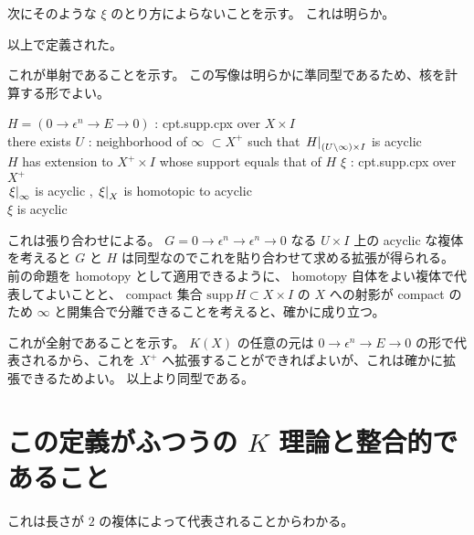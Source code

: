 \documentclass[dvipdfmx]{jsarticle}
\begin{document}
\begin{Proof}
\itemprof
次にそのような \(\xi\) のとり方によらないことを示す。
これは明らか。
\end{Proof}
以上で定義された。

これが単射であることを示す。
この写像は明らかに準同型であるため、核を計算する形でよい。

\begin{Theorem}
\itemprop
  \For \(H = (0 \to \epsilon^n \to E \to 0)\) : cpt.supp.cpx over \(X \times I\) \\
  \IfHold there exists \(U\) : neighborhood of \(\infty\) \(\subset X^+\) such that \(\left. {H} \right| _{(U \backslash \infty) \times I}\) is acyclic \\
  \Then \(H\) has extension to \(X^+ \times I\) whose support equals that of \(H\)
\itemprop
  \For \(\xi\) : cpt.supp.cpx over \(X^+\) \\
  \IfHold \(\left. {\xi} \right| _{\infty}\) is acyclic , \(\left. {\xi} \right| _{X}\) is homotopic to acyclic \\
  \Then \(\xi\) is acyclic
\end{Theorem}

\begin{Proof}
\itemprof
  これは張り合わせによる。
  \(G = 0 \to \epsilon^n \to \epsilon^n \to 0\) なる \(U \times I\) 上の acyclic な複体を考えると \(G\) と \(H\) は同型なのでこれを貼り合わせて求める拡張が得られる。
\itemprof
  前の命題を homotopy として適用できるように、 homotopy 自体をよい複体で代表してよいことと、 compact 集合 \(\text{supp} \, H \subset X \times I\) の \(X\) への射影が compact のため \(\infty\) と開集合で分離できることを考えると、確かに成り立つ。
\end{Proof}

これが全射であることを示す。
\(K(X)\) の任意の元は \(0 \to \epsilon^n \to E \to 0\) の形で代表されるから、これを \(X^+\) へ拡張することができればよいが、これは確かに拡張できるためよい。
以上より同型である。

\section{この定義がふつうの \(K\) 理論と整合的であること}
これは長さが \(2\) の複体によって代表されることからわかる。
\end{document}
